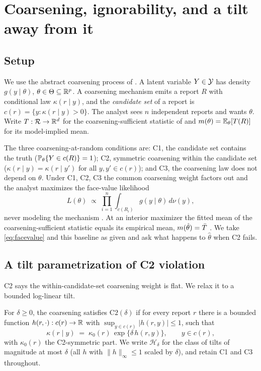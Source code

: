 \section{Coarsening, ignorability, and a tilt away from it}
\label{sec:framework}

\subsection{Setup}

We use the abstract coarsening process of \citet{towell2026synthesis}. A latent
variable $Y \in \mathcal{Y}$ has density $g(y \mid \theta)$, $\theta \in \Theta
\subseteq \mathbb{R}^p$. A coarsening mechanism emits a report $R$ with conditional law
$\kappa(r \mid y)$, and the \emph{candidate set} of a report is $c(r) = \{ y :
\kappa(r \mid y) > 0 \}$. The analyst sees $n$ independent reports and wants
$\theta$. Write $T : \mathcal{R} \to \mathbb{R}^d$ for the coarsening-sufficient statistic
of \citet{towell2026synthesis} and $m(\theta) = \mathbb{E}_\theta[T(R)]$ for its
model-implied mean.

The three coarsening-at-random conditions are: C1, the candidate set contains the
truth ($\mathbb{P}_\theta\{Y \in c(R)\} = 1$); C2, symmetric coarsening within the
candidate set ($\kappa(r \mid y) = \kappa(r \mid y')$ for all $y, y' \in c(r)$);
and C3, the coarsening law does not depend on $\theta$. Under C1, C2, C3 the common
coarsening weight factors out and the analyst maximizes the face-value likelihood
\begin{equation}
  L(\theta) \;\propto\; \prod_{i=1}^n \int_{c(R_i)} g(y \mid \theta) \, d\nu(y),
  \label{eq:facevalue}
\end{equation}
never modeling the mechanism \citep[Theorem on the C1--C2--C3
likelihood]{towell2026masked}. At an interior maximizer the fitted mean of the
coarsening-sufficient statistic equals its empirical mean, $m(\hat\theta) = \bar{T}$
\citep{towell2026synthesis}. We take \eqref{eq:facevalue} and this baseline as
given and ask what happens to $\hat\theta$ when C2 fails.

\subsection{A tilt parametrization of C2 violation}

C2 says the within-candidate-set coarsening weight is flat. We relax it to a
bounded log-linear tilt.

\begin{definition}
\label{def:tilt}
For $\delta \ge 0$, the coarsening satisfies $\mathrm{C2}(\delta)$ if for every
report $r$ there is a bounded function $h(r, \cdot) : c(r) \to \mathbb{R}$ with
$\sup_{y \in c(r)} |h(r,y)| \le 1$, such that
\begin{equation}
  \kappa(r \mid y) \;=\; \kappa_0(r)\, \exp\{\delta\, h(r, y)\},
  \qquad y \in c(r),
  \label{eq:tilt}
\end{equation}
with $\kappa_0(r)$ the C2-symmetric part. We write $\mathcal{H}_\delta$ for the
class of tilts of magnitude at most $\delta$ (all $h$ with $\|h\|_\infty \le 1$
scaled by $\delta$), and retain C1 and C3 throughout.
\end{definition}

